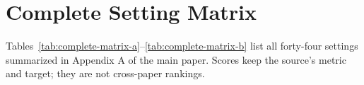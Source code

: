 \section{Complete Setting Matrix}\label{sec:supp-matrix}
Tables~\ref{tab:complete-matrix-a}--\ref{tab:complete-matrix-b} list all forty-four settings summarized in Appendix A of the main paper. Scores keep the source's metric and target; they are not cross-paper rankings.



